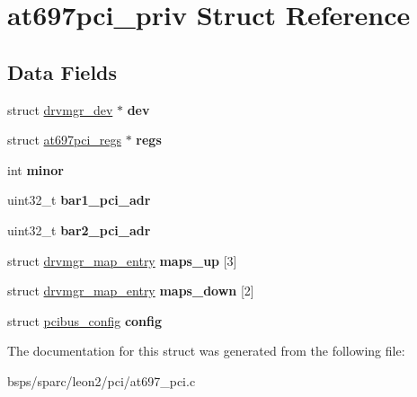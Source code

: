 \hypertarget{structat697pci__priv}{}\section{at697pci\+\_\+priv Struct Reference}
\label{structat697pci__priv}
\subsection*{Data Fields}
\begin{DoxyCompactItemize}
\item 
\mbox{\label{structat697pci__priv_aa7f2613069286922c483a0957fb055fc}} 
struct \mbox{\hyperlink{structdrvmgr__dev}{drvmgr\+\_\+dev}} $\ast$ {\bfseries dev}
\item 
\mbox{\label{structat697pci__priv_aef7b56a0f22a8581b31f82e21f965e17}} 
struct \mbox{\hyperlink{structat697pci__regs}{at697pci\+\_\+regs}} $\ast$ {\bfseries regs}
\item 
\mbox{\label{structat697pci__priv_a91905ebf69d82ee4ee14607be9b6657d}} 
int {\bfseries minor}
\item 
\mbox{\label{structat697pci__priv_a111ad806c9ea22b69c4cfd58f0411f86}} 
uint32\+\_\+t {\bfseries bar1\+\_\+pci\+\_\+adr}
\item 
\mbox{\label{structat697pci__priv_a00e1bbf0d7ebd00865ecff55588295a1}} 
uint32\+\_\+t {\bfseries bar2\+\_\+pci\+\_\+adr}
\item 
\mbox{\label{structat697pci__priv_a1ba07b0d7e2c94bd0fa154a102f49d89}} 
struct \mbox{\hyperlink{structdrvmgr__map__entry}{drvmgr\+\_\+map\+\_\+entry}} {\bfseries maps\+\_\+up} \mbox{[}3\mbox{]}
\item 
\mbox{\label{structat697pci__priv_a9531337fcf187be0bf5922ee5f1243c4}} 
struct \mbox{\hyperlink{structdrvmgr__map__entry}{drvmgr\+\_\+map\+\_\+entry}} {\bfseries maps\+\_\+down} \mbox{[}2\mbox{]}
\item 
\mbox{\label{structat697pci__priv_af3ba65cc4e09a30eda00a5d6d2b2c5d5}} 
struct \mbox{\hyperlink{structpcibus__config}{pcibus\+\_\+config}} {\bfseries config}
\end{DoxyCompactItemize}


The documentation for this struct was generated from the following file\+:\begin{DoxyCompactItemize}
\item 
bsps/sparc/leon2/pci/at697\+\_\+pci.\+c\end{DoxyCompactItemize}
